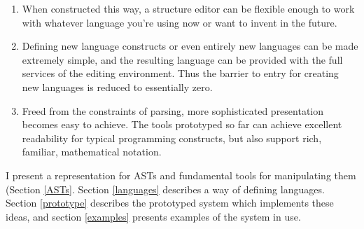 \begin{enumerate}
\item When constructed this way, a structure editor can be flexible enough to work with whatever language you're using now or want to invent in the future.
\item Defining new language constructs or even entirely new languages can be made extremely simple, and the resulting language can be provided with the full services of the editing environment. Thus the barrier to entry for creating new languages is reduced to essentially zero.
\item Freed from the constraints of parsing, more sophisticated presentation becomes easy to achieve. The tools prototyped so far can achieve excellent readability for typical programming constructs, but also support rich, familiar, mathematical notation.
\end{enumerate}

I present a representation for ASTs and fundamental tools for manipulating them (Section \ref{ASTs}. Section \ref{languages} describes a way of defining languages. Section \ref{prototype} describes the prototyped system which implements these ideas, and section \ref{examples} presents examples of the system in use. 



